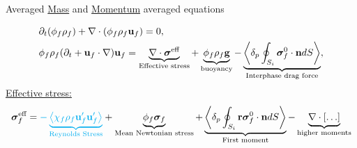 \documentclass{sintefbeamer}
\begin{document}
\begin{frame}{Averaged \underline{Mass} and \underline{Momentum} averaged equations }

  \begin{align*}
    &\partial_t (\phi_f \rho_f)  
    + \mathbf{\nabla}\cdot (
        \phi_f \rho_f\textbf{u}_f
    )
    = 
    0,\\
    &
    \phi_f \rho_f (\partial_t + \textbf{u}_f\cdot \mathbf{\nabla})\textbf{u}_f
    = 
    \underbrace{\mathbf{\nabla}\cdot \bm\sigma^\text{eff}}_\text{Effective stress}
    + \underbrace{\phi_f \rho_f \textbf{g} }_\text{buoyancy}
    - \underbrace{\left<\delta_p \oint_{S_{i}} {\bm{\sigma}_f^0 \cdot \textbf{n}} dS\right>}_\text{Interphase drag force},
  \end{align*}
  \underline{Effective stress: } 
  \begin{equation*}
    \bm{\sigma}_f^\text{eff}
    =
    \textcolor{cyan}{- \underbrace{\avg{\chi_f\rho_f\textbf{u}_f'\textbf{u}_f'}}_\text{Reynolds Stress}}
    + \underbrace{\phi_f \bm{\sigma}_f}_\text{Mean Newtonian stress}%
     + \underbrace{ {\pSavg{{\textbf{r}\bm{\sigma}_f^0 \cdot \textbf{n}}}}}_\text{First moment}
     -\underbrace{\div [\ldots]}_\text{higher moments}
  \end{equation*}
\end{frame}
\end{document}
